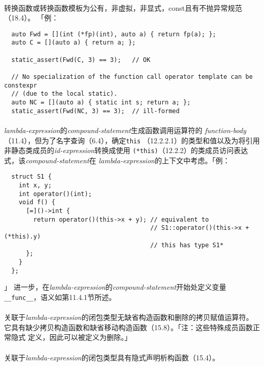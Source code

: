 \paragraph{}
转换函数或转换函数模板为公有，非虚拟，非显式，const且有不抛异常规范（18.4）。
「例：
\begin{lstlisting}
  auto Fwd = [](int (*fp)(int), auto a) { return fp(a); };
  auto C = [](auto a) { return a; };

  static_assert(Fwd(C, 3) == 3);   // OK

  // No specialization of the function call operator template can be constexpr
  // (due to the local static).
  auto NC = [](auto a) { static int s; return a; };
  static_assert(Fwd(NC, 3) == 3);  // ill-formed
\end{lstlisting}

\paragraph{}
\textit{lambda-expression}的\textit{compound-statement}生成函数调用运算符的
\textit{function-body}（11.4），但为了名字查询（6.4），确定\texttt{this}
（12.2.2.1）的类型和值以及为将引用非静态类成员的\textit{id-expression}转换成使用
\texttt{(*this)}（12.2.2）的类成员访问表达式，该\textit{compound-statement}在
\textit{lambda-expression}的上下文中考虑。「例：
\begin{lstlisting}
  struct S1 {
    int x, y;
    int operator()(int);
    void f() {
      [=]()->int {
        return operator()(this->x + y); // equivalent to
                                        // S1::operator()(this->x + (*this).y)
                                        // this has type S1*
      };
    }
  };
\end{lstlisting}」
进一步，在\textit{lambda-expression}的\textit{compound-statement}开始处定义变量
\texttt{\_\_func\_\_}，语义如第11.4.1节所述。

\paragraph{}
关联于\textit{lambda-expression}的闭包类型无缺省构造函数和删除的拷贝赋值运算符。
它具有缺少拷贝构造函数和缺省移动构造函数（15.8）。「注：这些特殊成员函数正常隐式
定义，因此可以被定义为删除。」

\paragraph{}
关联于\textit{lambda-expression}的闭包类型具有隐式声明析构函数（15.4）。

